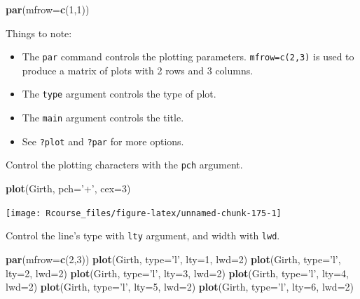 \documentclass[]{book}
\newenvironment{Shaded}{\begin{snugshade}}{\end{snugshade}}
\newcommand{\KeywordTok}[1]{\textcolor[rgb]{0.13,0.29,0.53}{\textbf{{#1}}}}
\newcommand{\DataTypeTok}[1]{\textcolor[rgb]{0.13,0.29,0.53}{{#1}}}
\newcommand{\DecValTok}[1]{\textcolor[rgb]{0.00,0.00,0.81}{{#1}}}
\newcommand{\StringTok}[1]{\textcolor[rgb]{0.31,0.60,0.02}{{#1}}}
\newcommand{\NormalTok}[1]{{#1}}
\providecommand{\tightlist}{%
  \setlength{\itemsep}{0pt}\setlength{\parskip}{0pt}}
\theoremstyle{definition}
\theoremstyle{definition}
\theoremstyle{remark}
\begin{document}
\begin{Shaded}
\begin{Highlighting}[]
\KeywordTok{par}\NormalTok{(}\DataTypeTok{mfrow=}\KeywordTok{c}\NormalTok{(}\DecValTok{1}\NormalTok{,}\DecValTok{1}\NormalTok{))}
\end{Highlighting}
\end{Shaded}

Things to note:

\begin{itemize}
\tightlist
\item
  The \texttt{par} command controls the plotting parameters.
  \texttt{mfrow=c(2,3)} is used to produce a matrix of plots with 2 rows
  and 3 columns.
\item
  The \texttt{type} argument controls the type of plot.
\item
  The \texttt{main} argument controls the title.
\item
  See \texttt{?plot} and \texttt{?par} for more options.
\end{itemize}

Control the plotting characters with the \texttt{pch} argument.

\begin{Shaded}
\begin{Highlighting}[]
\KeywordTok{plot}\NormalTok{(Girth, }\DataTypeTok{pch=}\StringTok{'+'}\NormalTok{, }\DataTypeTok{cex=}\DecValTok{3}\NormalTok{)}
\end{Highlighting}
\end{Shaded}

\texttt{[image: Rcourse\_files/figure-latex/unnamed-chunk-175-1]}

Control the line's type with \texttt{lty} argument, and width with
\texttt{lwd}.

\begin{Shaded}
\begin{Highlighting}[]
\KeywordTok{par}\NormalTok{(}\DataTypeTok{mfrow=}\KeywordTok{c}\NormalTok{(}\DecValTok{2}\NormalTok{,}\DecValTok{3}\NormalTok{))}
\KeywordTok{plot}\NormalTok{(Girth, }\DataTypeTok{type=}\StringTok{'l'}\NormalTok{, }\DataTypeTok{lty=}\DecValTok{1}\NormalTok{, }\DataTypeTok{lwd=}\DecValTok{2}\NormalTok{)}
\KeywordTok{plot}\NormalTok{(Girth, }\DataTypeTok{type=}\StringTok{'l'}\NormalTok{, }\DataTypeTok{lty=}\DecValTok{2}\NormalTok{, }\DataTypeTok{lwd=}\DecValTok{2}\NormalTok{)}
\KeywordTok{plot}\NormalTok{(Girth, }\DataTypeTok{type=}\StringTok{'l'}\NormalTok{, }\DataTypeTok{lty=}\DecValTok{3}\NormalTok{, }\DataTypeTok{lwd=}\DecValTok{2}\NormalTok{)}
\KeywordTok{plot}\NormalTok{(Girth, }\DataTypeTok{type=}\StringTok{'l'}\NormalTok{, }\DataTypeTok{lty=}\DecValTok{4}\NormalTok{, }\DataTypeTok{lwd=}\DecValTok{2}\NormalTok{)}
\KeywordTok{plot}\NormalTok{(Girth, }\DataTypeTok{type=}\StringTok{'l'}\NormalTok{, }\DataTypeTok{lty=}\DecValTok{5}\NormalTok{, }\DataTypeTok{lwd=}\DecValTok{2}\NormalTok{)}
\KeywordTok{plot}\NormalTok{(Girth, }\DataTypeTok{type=}\StringTok{'l'}\NormalTok{, }\DataTypeTok{lty=}\DecValTok{6}\NormalTok{, }\DataTypeTok{lwd=}\DecValTok{2}\NormalTok{)}
\end{Highlighting}
\end{Shaded}
\end{document}
